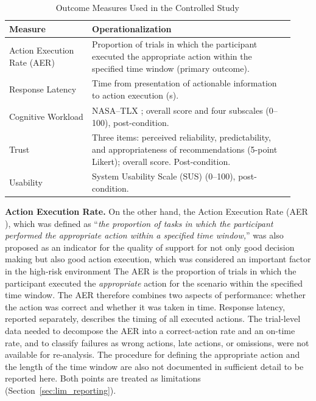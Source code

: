\documentclass[journal]{IEEEtran}
\theoremstyle{plain}
\theoremstyle{definition}
\providecommand{\DIFaddtex}[1]{{\protect\color{blue} \sf #1}} %
\providecommand{\DIFdeltex}[1]{{\protect\color{red} \scriptsize #1}} %
\providecommand{\DIFaddbegin}{} %
\providecommand{\DIFaddend}{} %
\providecommand{\DIFdelbegin}{} %
\providecommand{\DIFdelend}{} %
\providecommand{\DIFadd}[1]{\texorpdfstring{\DIFaddtex{#1}}{#1}} %
\providecommand{\DIFdel}[1]{\texorpdfstring{\DIFdeltex{#1}}{}} %
\newcommand{\DIFscaledelfig}{0.5}
\newlength{\DIFdelgraphicswidth} %
\newlength{\DIFdelgraphicsheight} %
\newcommand{\DIFaddincludegraphics}[2][]{{\color{blue}\fbox{\DIFOincludegraphics[#1]{#2}}}} %
\newcommand{\DIFdelincludegraphics}[2][]{%
\sbox{\DIFdelgraphicsbox}{\DIFOincludegraphics[#1]{#2}}%
\settoboxwidth{\DIFdelgraphicswidth}{\DIFdelgraphicsbox} %
\settoboxtotalheight{\DIFdelgraphicsheight}{\DIFdelgraphicsbox} %
\scalebox{\DIFscaledelfig}{%
\parbox[b]{\DIFdelgraphicswidth}{\usebox{\DIFdelgraphicsbox}\\[-\baselineskip] \rule{\DIFdelgraphicswidth}{0em}}\llap{\resizebox{\DIFdelgraphicswidth}{\DIFdelgraphicsheight}{%
\setlength{\unitlength}{\DIFdelgraphicswidth}%
\begin{picture}(1,1)%
\thicklines\linethickness{2pt} %
{\color[rgb]{1,0,0}\put(0,0){\framebox(1,1){}}}%
{\color[rgb]{1,0,0}\put(0,0){\line( 1,1){1}}}%
{\color[rgb]{1,0,0}\put(0,1){\line(1,-1){1}}}%
\end{picture}%
}\hspace*{3pt}}} %
} %
\DeclareRobustCommand{\DIFaddbegin}{\DIFOaddbegin \let\includegraphics\DIFaddincludegraphics} %
\DeclareRobustCommand{\DIFaddend}{\DIFOaddend \let\includegraphics\DIFOincludegraphics} %
\DeclareRobustCommand{\DIFdelbegin}{\DIFOdelbegin \let\includegraphics\DIFdelincludegraphics} %
\DeclareRobustCommand{\DIFdelend}{\DIFOaddend \let\includegraphics\DIFOincludegraphics} %
\begin{document}
    \begin{table}[t]
        \caption{Outcome Measures Used in the Controlled Study}
        \label{tab:measures}
        \centering
        \begin{tabular}{p{0.27\linewidth}p{0.66\linewidth}}
            \toprule
            \textbf{Measure} & \textbf{Operationalization} \\
            \midrule
            Action Execution Rate (AER) & Proportion of trials in which the participant executed the appropriate action within the specified time window (primary outcome). \\
            Response Latency & Time from presentation of actionable information to action execution (s). \\
            Cognitive Workload & NASA--TLX \cite{Hart1988}; overall score and four subscales (0--100), post-condition. \\
            Trust & Three items: perceived reliability, predictability, and appropriateness of recommendations (5-point Likert); overall score. Post-condition. \\
            Usability & System Usability Scale (SUS) \cite{Brooke1996} (0--100), post-condition. \\
            \bottomrule
        \end{tabular}
    \end{table}
\DIFaddend 

    \textbf{Action Execution Rate.}
    \DIFdelbegin \DIFdel{On the other hand, the Action Execution Rate (AER ), which was defined as ``\textit{the proportion of tasks in which the participant performed the appropriate action within a specified time window,}'' was also proposed as an indicator for the quality of support for not only good decision making but also good action execution, which was considered an important factor in the high-risk environment}\DIFdelend \DIFaddbegin \DIFadd{The AER is the proportion of trials in which the participant executed the \emph{appropriate} action for the scenario within the specified time window. The AER therefore combines two aspects of performance: whether the action was correct and whether it was taken in time. Response latency, reported separately, describes the timing of all executed actions. The trial-level data needed to decompose the AER into a correct-action rate and an on-time rate, and to classify failures as wrong actions, late actions, or omissions, were not available for re-analysis. The procedure for defining the appropriate action and the length of the time window are also not documented in sufficient detail to be reported here. Both points are treated as limitations (Section~\ref{sec:lim_reporting})}\DIFaddend .
\end{document}
